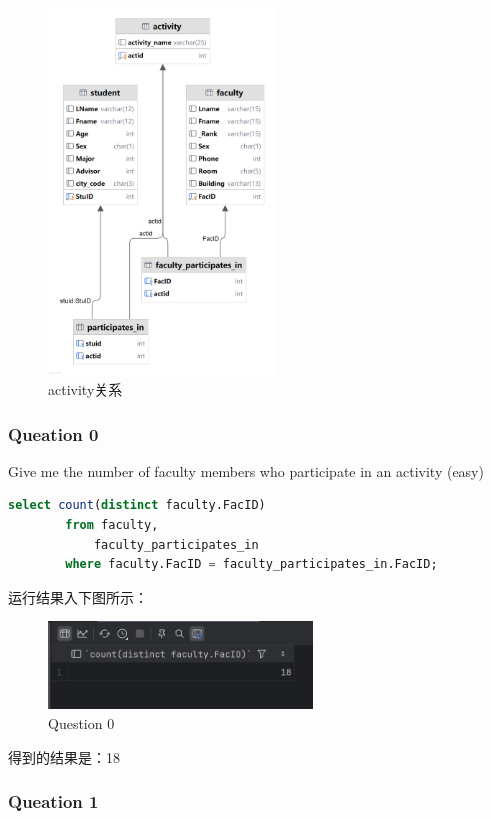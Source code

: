 \documentclass{article}
\begin{document}
    \begin{figure}[H]
    	\centering
    	\includegraphics[width=6cm]{./images/2.activity关系.png}
    	\caption{activity关系}
    \end{figure}
    
    \subsubsection{Queation 0}
    
    Give me the number of faculty members who participate in an activity  (easy)
    
    \begin{lstlisting}[language=sql, title=Queation 0, tabsize=4]
    	select count(distinct faculty.FacID)
    	from faculty,
    		faculty_participates_in
    	where faculty.FacID = faculty_participates_in.FacID;
    \end{lstlisting}
    
    运行结果入下图所示：
    
    \begin{figure}[H]
    	\centering
    	\includegraphics[width=7cm]{./images/3.Question 0.png}
    	\caption{Question 0}
    \end{figure}
    
    得到的结果是：18
    
    \subsubsection{Queation 1}
    
\end{document}
